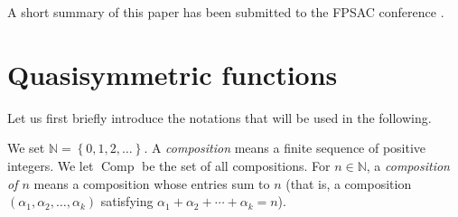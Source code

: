 \documentclass[12pt]{article}
\theoremstyle{plain}
\theoremstyle{definition}
\theoremstyle{remark}
\newcommand{\Comp}{{\operatorname{Comp}}}
\newcommand{\NN}{{\mathbb{N}}}
\begin{document}
A short summary of this paper has been submitted to the FPSAC
conference \cite{Gri-extabs}.

\section{Quasisymmetric functions}
\label{sect.qsym-intro}

Let us first briefly introduce the notations that will be used in the
following.

We set $\NN = \left\{0, 1, 2, \ldots\right\}$. A \textit{composition}
means a finite sequence of positive integers. We let $\Comp$ be the set
of all compositions. For $n \in \NN$, a \textit{composition of $n$}
means a composition whose entries sum to $n$ (that is, a composition
$\left(\alpha_1, \alpha_2, \ldots, \alpha_k\right)$ satisfying
$\alpha_1 + \alpha_2 + \cdots + \alpha_k = n$).
\end{document}
